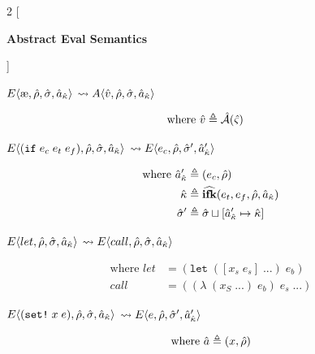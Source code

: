 \documentclass[12pt,draft]{article}
\newcommand\mae{\ensuremath{\text{\ae}}}
\newcommand{\ifsyn}[3]{(\texttt{if}\;#1\;#2\;#3)}
\newcommand{\setsyn}[2]{(\texttt{set!}\;#1\;#2)}
\newcommand{\E}[4]{E\langle #1 , #2 , #3 , #4 \rangle}
\newcommand{\A}[4]{A\langle #1 , #2 , #3 , #4 \rangle}
\begin{document}
\newcommand{\aaeval}[0]{\hat{\mathcal{A}}}

\begin{multicols*}{2}
  [
  \begin{center}
    \textbf{Abstract Eval Semantics}
  \end{center}
  ]
  \begin{center}
    $\E{\mae}{\aenv}{\astore}{\akaddr}$
    $\leadsto \A{\aval}{\aenv}{\astore}{\akaddr}$
  \end{center}
  \vspace{-7mm}
  \begin{align*}
    \text{where }
    \aval &\triangleq \aaeval(\astate)
  \end{align*}
  \begin{center}
    $\E{\ifsyn{e_c}{e_t}{e_f}}{\aenv}{\astore}{\akaddr}$
    $\leadsto \E{e_c}{\aenv}{\astore'}{\akaddr'}$
  \end{center}
  \vspace{-7mm}
  \begin{align*}
    \text{where }
    \hat{a}_{\hat{\kappa}}' &\triangleq (e_c , \hat{\rho}) \\
    \hat{\kappa} &\triangleq \widehat{\textbf{ifk}}(e_t , e_f , \hat{\rho} , \hat{a}_{\hat{\kappa}}) \\
    \hat{\sigma}' &\triangleq \hat{\sigma} \sqcup [\hat{a}_{\hat{\kappa}}' \mapsto \hat{\kappa}]
  \end{align*}
  \begin{center}
    $\E{let}{\aenv}{\astore}{\akaddr}$
    $\leadsto \E{call}{\aenv}{\astore}{\akaddr}$
  \end{center}
  \vspace{-7mm}
  \begin{align*}
    \text{where }
    let &= (\texttt{let} \; ([x_s \; e_s] \; ...) \; e_b) \\
    call &= ((\lambda \; (x_S \; ...) \; e_b) \; e_s \; ...)
  \end{align*}
  \begin{center}
    $\E{\setsyn{x}{e}}{\aenv}{\astore}{\akaddr}$
    $\leadsto \E{e}{\aenv}{\astore'}{\akaddr'}$
  \end{center}
  \vspace{-7mm}
  \begin{align*}
    \text{where }
    \abaddr &\triangleq (x , \aenv) \\

\end{align*}
\end{multicols*}
\end{document}
